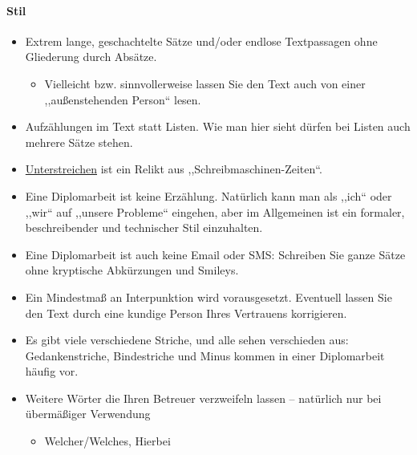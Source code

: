 \documentclass[a4paper,ngerman,naustrian,DIV=12,BCOR=1cm]{scrbook}
\begin{document}
\paragraph{Stil}
\begin{itemize}
\item Extrem lange, geschachtelte Sätze und/oder endlose Textpassagen ohne
Gliederung durch Absätze.\nopagebreak

\begin{itemize}
\item Vielleicht bzw. sinnvollerweise lassen Sie den Text auch von einer
,,außenstehenden Person`` lesen.
\end{itemize}
\item Aufzählungen im Text statt Listen. Wie man hier sieht dürfen bei Listen
auch mehrere Sätze stehen.
\item \uline{Unterstreichen} ist ein Relikt aus ,,Schreibmaschinen-Zeiten``.
\item Eine Diplomarbeit ist keine Erzählung. Natürlich kann man als ,,ich``
oder ,,wir`` auf ,,unsere Probleme`` eingehen, aber im Allgemeinen
ist ein formaler, beschreibender und technischer Stil einzuhalten.
\item Eine Diplomarbeit ist auch keine Email oder SMS: Schreiben Sie ganze
Sätze ohne kryptische Abkürzungen und Smileys.
\item Ein Mindestmaß an Interpunktion wird vorausgesetzt. Eventuell lassen
Sie den Text durch eine kundige Person Ihres Vertrauens korrigieren.
\item Es gibt viele verschiedene Striche, und alle sehen verschieden aus:
Gedankenstriche, Bindestriche und Minus kommen in einer Diplomarbeit
häufig vor.
\item Weitere Wörter die Ihren Betreuer verzweifeln lassen -- natürlich
nur bei übermäßiger Verwendung

\begin{itemize}
\item Welcher/Welches, Hierbei
\end{itemize}
\end{itemize}
\end{document}
